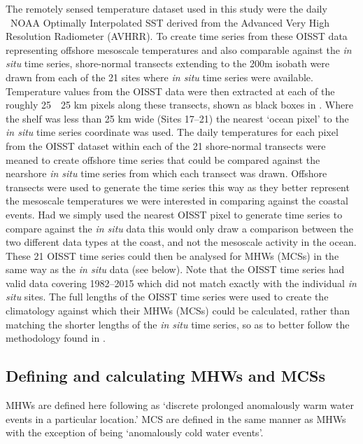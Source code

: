 \documentclass[a4paper,10pt,review]{elsarticle}
\begin{document}
The remotely sensed temperature dataset used in this study were the daily \degree~NOAA Optimally Interpolated SST \citep[OISST;][]{Reynolds2007} derived from the Advanced Very High Resolution Radiometer (AVHRR). To create time series from these OISST data representing offshore mesoscale temperatures and also comparable against the \emph{in situ} time series, shore-normal transects extending to the 200m isobath were drawn from each of the 21 sites where \emph{in situ} time series were available. Temperature values from the OISST data were then extracted at each of the roughly 25~\texttimes~25 km pixels along these transects, shown as black boxes in . Where the shelf was less than 25 km wide (Sites 17--21) the nearest `ocean pixel' to the \emph{in situ} time series coordinate was used. The daily temperatures for each pixel from the OISST dataset within each of the 21 shore-normal transects were meaned to create offshore time series that could be compared against the nearshore \emph{in situ} time series from which each transect was drawn. Offshore transects were used to generate the time series this way as they better represent the mesoscale temperatures we were interested in comparing against the coastal events. Had we simply used the nearest OISST pixel to generate time series to compare against the \emph{in situ} data this would only draw a comparison between the two different data types at the coast, and not the mesoscale activity in the ocean. These 21 OISST time series could then be analysed for MHWs (MCSs) in the same way as the \emph{in situ} data (see below). Note that the OISST time series had valid data covering 1982--2015 which did not match exactly with the individual \emph{in situ} sites. The full lengths of the OISST time series were used to create the climatology against which their MHWs (MCSs) could be calculated, rather than matching the shorter lengths of the \emph{in situ} time series, so as to better follow the methodology found in \cite{Hobday2016}.

\subsection{Defining and calculating MHWs and MCSs}
MHWs are defined here following \citet{Hobday2016} as `discrete prolonged anomalously warm water events in a particular location.' MCS are defined in the same manner as MHWs with the exception of being `anomalously cold water events'.
\end{document}
